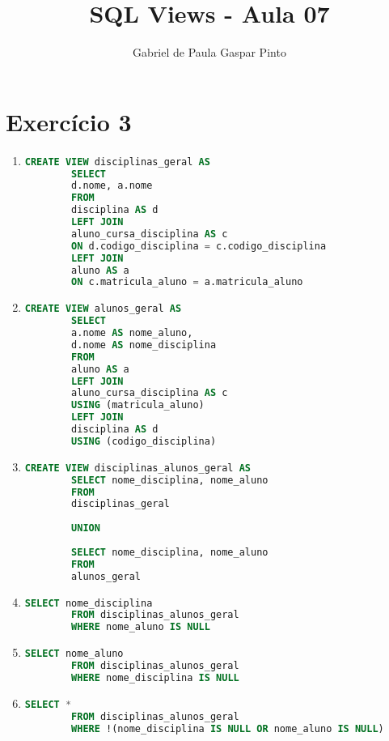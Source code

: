 \documentclass{article}
\title{SQL Views - Aula 07}
\author{Gabriel de Paula Gaspar Pinto}
\date{}
\begin{document}
\maketitle

\section*{Exercício 3}

\begin{enumerate}[label=\alph*)]

    \item 
    \begin{lstlisting}[language=SQL]
        CREATE VIEW disciplinas_geral AS
        SELECT
        d.nome, a.nome
        FROM
        disciplina AS d
        LEFT JOIN
        aluno_cursa_disciplina AS c
        ON d.codigo_disciplina = c.codigo_disciplina
        LEFT JOIN
        aluno AS a
        ON c.matricula_aluno = a.matricula_aluno
    \end{lstlisting}

    \item
    \begin{lstlisting}[language=SQL]
        CREATE VIEW alunos_geral AS
        SELECT
        a.nome AS nome_aluno,
        d.nome AS nome_disciplina
        FROM
        aluno AS a
        LEFT JOIN
        aluno_cursa_disciplina AS c
        USING (matricula_aluno)
        LEFT JOIN
        disciplina AS d
        USING (codigo_disciplina)
    \end{lstlisting}

    \item 
    \begin{lstlisting}[language=SQL]
        CREATE VIEW disciplinas_alunos_geral AS
        SELECT nome_disciplina, nome_aluno
        FROM
        disciplinas_geral
        
        UNION
        
        SELECT nome_disciplina, nome_aluno
        FROM
        alunos_geral        
    \end{lstlisting}

    \item 
    \begin{lstlisting}[language=SQL]
        SELECT nome_disciplina
        FROM disciplinas_alunos_geral
        WHERE nome_aluno IS NULL
    \end{lstlisting}

    \item 
    \begin{lstlisting}[language=SQL]
        SELECT nome_aluno
        FROM disciplinas_alunos_geral
        WHERE nome_disciplina IS NULL
    \end{lstlisting}

    \item 
    \begin{lstlisting}[language=SQL]
        SELECT *
        FROM disciplinas_alunos_geral
        WHERE !(nome_disciplina IS NULL OR nome_aluno IS NULL)        
    \end{lstlisting}

\end{enumerate}
\end{document}
